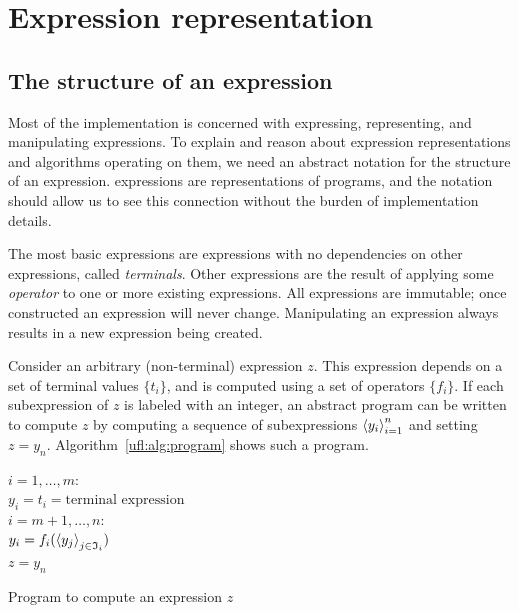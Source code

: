 \section{Expression representation} \label{ufl:sec:representation}

\subsection{The structure of an expression} \label{ufl:sec:expressions}

Most of the \ufl{} implementation is concerned with expressing,
representing, and manipulating expressions.  To explain and reason
about expression representations and algorithms operating on them, we
need an abstract notation for the structure of an expression.  \ufl{}
expressions are representations of programs, and the notation should
allow us to see this connection without the burden of implementation
details.

The most basic \ufl{} expressions are expressions with no dependencies
on other expressions, called \emph{terminals}.  Other expressions are
the result of applying some \emph{operator} to one or more existing
expressions.  All expressions are immutable; once constructed an
expression will never change. Manipulating an expression always
results in a new expression being created.

Consider an arbitrary (non-terminal) expression $z$.  This expression
depends on a set of terminal values $\{ t_i \}$, and is computed using
a set of operators $\{ f_i \}$.  If each subexpression of $z$ is
labeled with an integer, an abstract program can be written to compute
$z$ by computing a sequence of subexpressions $\left\langle{y_i}\right\rangle_{i=1}^n$ and
setting $z = y_n$.  Algorithm~\ref{ufl:alg:program} shows such a
program.

\begin{algorithm}
\afor $i = 1, \ldots, m$:\\
\tab $ y_i =  t_i = \mbox{terminal expression}$ \\
\afor $i = m+1, \ldots, n$:\\
\tab $ y_i =  f_i(\left\langle{y_j}\right\rangle_{j\in\mathfrak{I}_i})$ \\
$z = y_n$
\caption{Program to compute an expression $z$}
\label{ufl:alg:program}
\end{algorithm}

